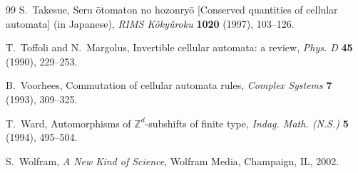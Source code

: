 \begin{thebibliography}{99}
 S.~Takesue, Seru \=otomaton no hozonry\=o [Conserved quantities of cellular automata] (in Japanese), \emph{RIMS K\^oky\^uroku} \textbf{1020} (1997), 103--126.

 T.~Toffoli and N.~Margolus, Invertible cellular automata: a review, \emph{Phys. D} \textbf{45} (1990), 229--253.

 B.~Voorhees, Commutation of cellular automata rules, \emph{Complex Systems} \textbf{7} (1993), 309--325.

 T.~Ward, Automorphisms of $\mathbb{Z}^d$-subshifts of finite type, \emph{Indag. Math. (N.S.)} \textbf{5} (1994), 495--504.

 S.~Wolfram, \emph{A New Kind of Science}, Wolfram Media, Champaign, IL, 2002.

\end{thebibliography}
